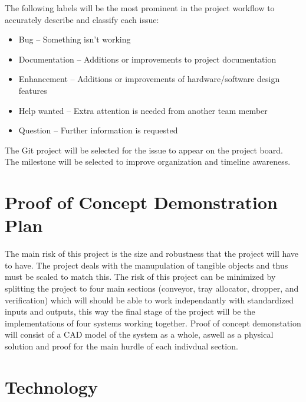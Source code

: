 \documentclass{article}
\begin{document}
	\noindent The following labels will be the most prominent in the project workflow to accurately describe and classify each issue: 

	\begin{itemize}
		\item Bug – Something isn’t working
		\item Documentation – Additions or improvements to project documentation 
		\item Enhancement – Additions or improvements of hardware/software design features 
		\item Help wanted – Extra attention is needed from another team member 
		\item Question – Further information is requested 
	\end{itemize}
	\noindent The Git project will be selected for the issue to appear on the project board.\\

	\noindent The milestone will be selected to improve organization and timeline awareness.\\
	
	\section{Proof of Concept Demonstration Plan}
	
	The main risk of this project is the size and robustness that the project will have to have. The project deals with the manupulation of tangible objects and thus must be scaled to match this.
	The risk of this project can be minimized by splitting the project to four main sections (conveyor, tray allocator, dropper, and verification) which will should be able to work independantly with standardized inputs and outputs, this way the final stage of the project will be 
	the implementations of four systems working together. Proof of concept demonstation will consist of a CAD model of the system as a whole, aswell as a physical solution and proof for the main hurdle of each indivdual section.
	
	
	\section{Technology}
	
\end{document}
